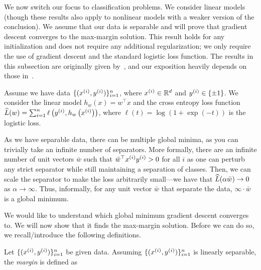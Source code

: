 We now switch our focus to classification problems. We consider linear models (though these results also apply to nonlinear models with a weaker version of the conclusion). We assume that our data is separable and will prove that gradient descent converges to the max-margin solution. This result holds for any initialization and does not require any additional regularization; we only require the use of gradient descent and the standard logistic loss function. The results in this subsection are originally given by~\citet{soudry2018implicit}, and our exposition heavily depends on those in~\cite{ji2018risk,mjt_dlt}. 

Assume we have data $\{(x\sp{i}, y\sp{i}) \}_{i=1}^n $, where $x\sp{i} \in \R^d$ and $y\sp{i} \in \{\pm 1 \}$. We consider the linear model $ h_w(x) = w^\top x$ and the cross entropy loss function $\hatL (w) = \sum_{i=1}^n \ell\left(y\sp{i}, h_w\l (x\sp{i} \r )\right)$, where $ \ell(t) = \log(1 + \exp(-t))$ is the logistic loss.

As we have separable data, there can be multiple global minima, as you can trivially take an infinite number of separators. More formally, there are an infinite number of unit vectors $\bar{w}$ such that $\bar{w}^\top x\sp{i} y\sp{i} > 0$ for all $i$ as one can perturb any strict separator  while still maintaining a separation of classes. Then, we can scale the separator to make the loss arbitrarily small---we have that $ \hatL(\alpha \bar{w}) \to 0$ as $ \alpha \to \infty$. Thus, informally, for any unit vector $\bar{w}$ that separate the data, $\infty \cdot \bar{w}$ is a global minimum. %

We would like to understand which global minimum gradient descent converges to. We will now show that it finds the max-margin solution. Before we can do so, we recall/introduce the following definitions.

\begin{definition}[Margin]
Let $\{(x\sp{i}, y\sp{i}) \}_{i=1}^n $ be given data. Assuming $\{(x\sp{i}, y\sp{i}) \}_{i=1}^n$ is linearly separable, the \textit{margin} is defined as
\end{definition}

